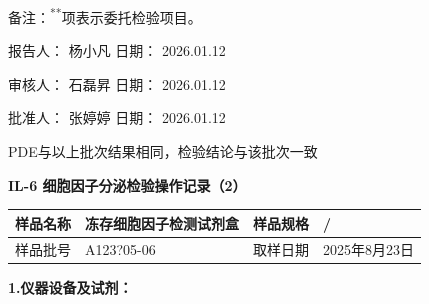 \documentclass[UTF8,10pt,a4paper,fontset=fandol]{ctexart}
\newcommand{\fieldvalue}[1]{#1}
\newcommand{\handwritten}[1]{#1}
\begin{document}
备注：\textsuperscript{**}项表示委托检验项目。

报告人：
\fieldvalue{\handwritten{杨小凡}}
\qquad
日期：
\fieldvalue{\handwritten{2026.01.12}}

审核人：
\fieldvalue{\handwritten{石磊昇}}
\qquad
日期：
\fieldvalue{\handwritten{2026.01.12}}

批准人：
\fieldvalue{\handwritten{张婷婷}}
\qquad
日期：
\fieldvalue{\handwritten{2026.01.12}}

\fieldvalue{\handwritten{PDE与以上批次结果相同，检验结论与该批次一致}}

\newpage

\begin{center}
\textbf{IL-6 细胞因子分泌检验操作记录（2）}
\end{center}

\noindent
\begin{tabular}{|p{2.2cm}|p{6.0cm}|p{2.0cm}|p{4.0cm}|}
\hline
样品名称 &
\fieldvalue{\handwritten{冻存细胞因子检测试剂盒}} &
样品规格 &
\fieldvalue{\handwritten{/}} \\
\hline
样品批号 &
\fieldvalue{\handwritten{A123?05-06}} &
取样日期 &
\fieldvalue{\handwritten{2025年8月23日}} \\
\hline
\end{tabular}

\medskip
\noindent\textbf{1.\quad 仪器设备及试剂：}
\end{document}
